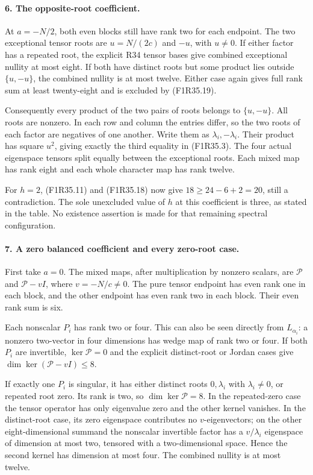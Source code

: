 \paragraph{6. The opposite-root coefficient.}
At $a=-N/2$, both even blocks still have rank two
for each endpoint. The two exceptional tensor roots
are $u=N/(2c)$ and $-u$, with $u\ne0$.
If either factor has a repeated root, the explicit
R34 tensor bases give combined exceptional nullity
at most eight. If both have distinct roots but some
product lies outside $\{u,-u\}$, the combined
nullity is at most twelve. Either case again gives
full rank sum at least twenty-eight and is excluded
by (F1R35.19).

Consequently every product of the two pairs of roots
belongs to $\{u,-u\}$. All roots are nonzero. In each
row and column the entries differ, so the two roots
of each factor are negatives of one another. Write
them as $\lambda_i,-\lambda_i$. Their product has
square $u^2$, giving exactly the third equality in
(F1R35.3). The four actual eigenspace tensors split
equally between the exceptional roots. Each mixed
map has rank eight and each whole character map
has rank twelve.

For $h=2$, (F1R35.11) and (F1R35.18) now give
$18\ge24-6+2=20$, still a contradiction. The sole
unexcluded value of $h$ at this coefficient is three,
as stated in the table. No existence assertion is
made for that remaining spectral configuration.

\paragraph{7. A zero balanced coefficient and every zero-root case.}
First take $a=0$. The mixed maps, after multiplication
by nonzero scalars, are $\mathcal P$ and
$\mathcal P-vI$, where $v=-N/c\ne0$.
The pure tensor endpoint has even rank one in each
block, and the other endpoint has even rank two in
each block. Their even rank sum is six.

Each nonscalar $P_i$ has rank two or four. This can
also be seen directly from $L_{\alpha_i}$: a nonzero
two-vector in four dimensions has wedge map of rank
two or four. If both $P_i$ are invertible,
$\ker\mathcal P=0$ and the explicit distinct-root
or Jordan cases give $\dim\ker(\mathcal P-vI)\le8$.

If exactly one $P_i$ is singular, it has either
distinct roots $0,\lambda_i$ with $\lambda_i\ne0$,
or repeated root zero. Its rank is two, so
$\dim\ker\mathcal P=8$. In the repeated-zero case
the tensor operator has only eigenvalue zero and the
other kernel vanishes. In the distinct-root case,
its zero eigenspace contributes no $v$-eigenvectors;
on the other eight-dimensional summand the nonscalar
invertible factor has a $v/\lambda_i$ eigenspace of
dimension at most two, tensored with a two-dimensional
space. Hence the second kernel has dimension at most
four. The combined nullity is at most twelve.

